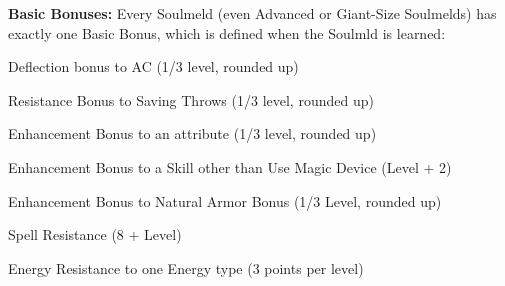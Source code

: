 \textbf{Basic Bonuses:} Every Soulmeld (even Advanced or Giant-Size Soulmelds) has exactly one Basic Bonus, which is defined when the Soulmld is learned:
\begin{itemize*}
\item Deflection bonus to AC (1/3 level, rounded up)
\item Resistance Bonus to Saving Throws (1/3 level, rounded up)
\item Enhancement Bonus to an attribute (1/3 level, rounded up)
\item Enhancement Bonus to a Skill other than Use Magic Device (Level + 2)
\item Enhancement Bonus to Natural Armor Bonus (1/3 Level, rounded up)
\item Spell Resistance (8 + Level)
\item Energy Resistance to one Energy type (3 points per level)
\end{itemize*}


